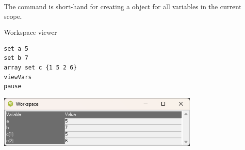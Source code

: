\documentclass{article}
\renewcommand{\^}[1]{\textsuperscript{#1}}
\renewcommand{\_}[1]{\textsubscript{#1}}
\begin{document}
The command  is short-hand for creating a  object for all variables in the current scope.
\begin{syntax}
\end{syntax}

\begin{example}{Workspace viewer}
\begin{lstlisting}
set a 5
set b 7
array set c {1 5 2 6}
viewVars
pause
\end{lstlisting}
\tcblower

\includegraphics[width = 4in]{figures/workspace.png}
\end{example}
\end{document}
